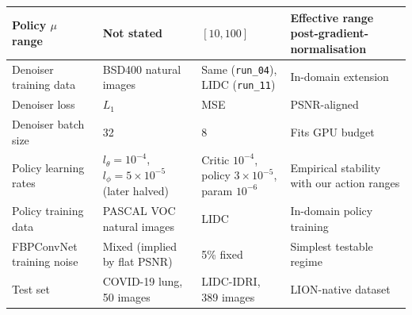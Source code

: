\begin{table}[H]
\begin{tabular}{L{3cm}L{3cm}L{3cm}L{4.5cm}}
        Policy $\mu$ range     & Not stated                & $[10, 100]$ & Effective range post-gradient-normalisation \\ \hline
        Denoiser training data & BSD400 natural images     & Same (\texttt{run\_04}), LIDC (\texttt{run\_11}) & In-domain extension \\ \hline
        Denoiser loss          & $L_1$                     & MSE  & PSNR-aligned \\ \hline
        Denoiser batch size    & 32                        & 8    & Fits GPU budget \\ \hline
        Policy learning rates  & $l_\theta{=}10^{-4}$, $l_\phi{=}5{\times}10^{-5}$ (later halved) & Critic $10^{-4}$, policy $3{\times}10^{-5}$, param $10^{-6}$ & Empirical stability with our action ranges \\ \hline
        Policy training data   & PASCAL VOC natural images & LIDC & In-domain policy training \\ \hline
        FBPConvNet training noise & Mixed (implied by flat PSNR) & 5\% fixed & Simplest testable regime \\ \hline
        Test set               & COVID-19 lung, 50 images  & LIDC-IDRI, 389 images & LION-native dataset \\
        \bottomrule
    \end{tabular}
\end{table}